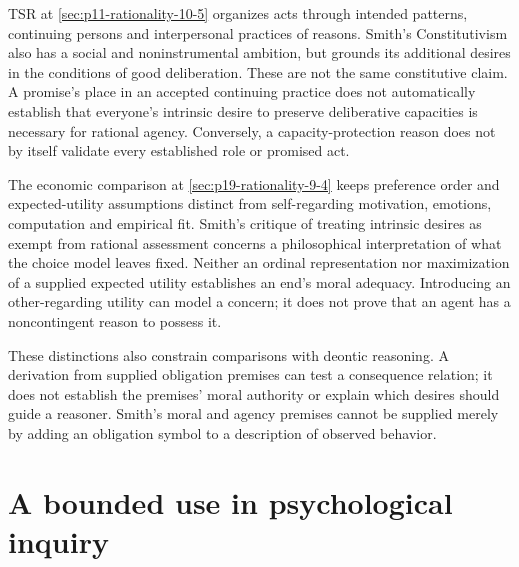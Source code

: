 TSR at \cref{sec:p11-rationality-10-5} organizes acts through intended
patterns, continuing persons and interpersonal practices of reasons.
Smith's Constitutivism also has a social and noninstrumental ambition,
but grounds its additional desires in the conditions of good deliberation.
These are not the same constitutive claim. A promise's place in an
accepted continuing practice does not automatically establish that
everyone's intrinsic desire to preserve deliberative capacities is
necessary for rational agency. Conversely, a capacity-protection reason
does not by itself validate every established role or promised act.

The economic comparison at \cref{sec:p19-rationality-9-4} keeps
preference order and expected-utility assumptions distinct from
self-regarding motivation, emotions, computation and empirical fit.
Smith's critique of treating intrinsic desires as exempt from rational
assessment concerns a philosophical interpretation of what the choice
model leaves fixed. Neither an ordinal representation nor maximization
of a supplied expected utility establishes an end's moral adequacy.
Introducing an other-regarding utility can model a concern; it does
not prove that an agent has a noncontingent reason to possess it.

These distinctions also constrain comparisons with deontic reasoning.
A derivation from supplied obligation premises can test a consequence
relation; it does not establish the premises' moral authority or explain
which desires should guide a reasoner. Smith's moral and agency premises
cannot be supplied merely by adding an obligation symbol to a description
of observed behavior.

\section{A bounded use in psychological inquiry}
\label{sec:p11-r122-use}

